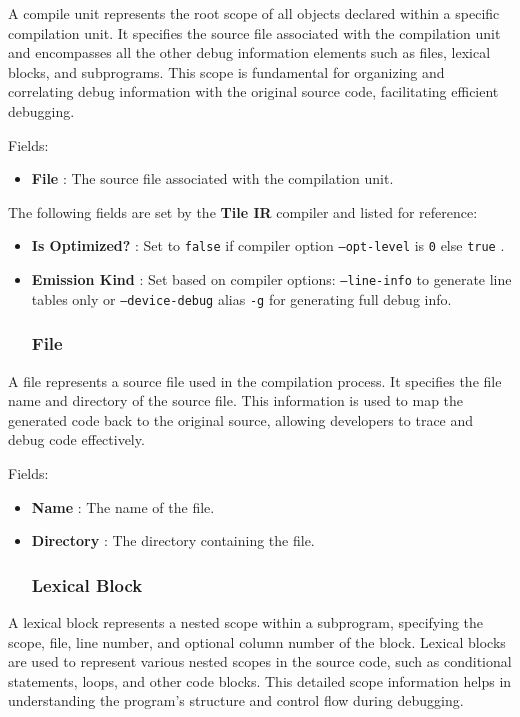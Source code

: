 \documentclass{article}
\begin{document}
A compile unit represents the root scope of all objects declared within a specific compilation unit. It specifies the source file associated with the compilation unit and encompasses all the other debug information elements such as files, lexical blocks, and subprograms. This scope is fundamental for organizing and correlating debug information with the original source code, facilitating efficient debugging.


Fields:


\begin{itemize}
\item \textbf{File} : The source file associated with the compilation unit.

\end{itemize}
The following fields are set by the \textbf{Tile IR} compiler and listed for reference:


\begin{itemize}
\item \textbf{Is Optimized?} : Set to \texttt{false} if compiler option \texttt{--opt-level} is \texttt{0} else \texttt{true} .
\item \textbf{Emission Kind} : Set based on compiler options: \texttt{--line-info} to generate line tables only or \texttt{--device-debug} alias \texttt{-g} for generating full debug info.


\subsubsection{File}

\end{itemize}
A file represents a source file used in the compilation process. It specifies the file name and directory of the source file. This information is used to map the generated code back to the original source, allowing developers to trace and debug code effectively.


Fields:


\begin{itemize}
\item \textbf{Name} : The name of the file.
\item \textbf{Directory} : The directory containing the file.


\subsubsection{Lexical Block}

\end{itemize}
A lexical block represents a nested scope within a subprogram, specifying the scope, file, line number, and optional column number of the block. Lexical blocks are used to represent various nested scopes in the source code, such as conditional statements, loops, and other code blocks. This detailed scope information helps in understanding the program's structure and control flow during debugging.
\end{document}
